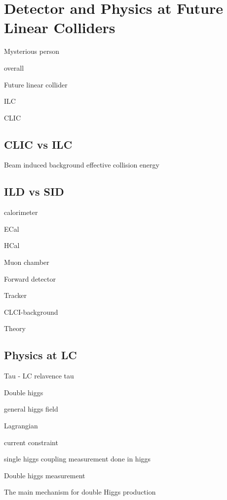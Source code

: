 \chapter{Detector and Physics at Future Linear Colliders}
\label{chap:Theory}

%
{Mysterious person}%

overall

Future linear collider

ILC

CLIC

\section{CLIC vs ILC}

Beam induced background
effective collision energy

\section{ILD vs SID}


calorimeter

ECal

HCal

Muon chamber

Forward detector

Tracker

CLCI-background

Theory


\section{Physics at LC}

Tau - LC relavence tau

Double higgs


general higgs field

Lagrangian

current constraint

single higgs coupling measurement done in higgs

Double higgs measurement

The main mechanism for double Higgs production %

